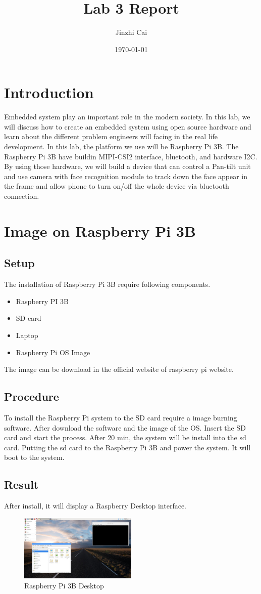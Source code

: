 \documentclass{article}
\title{Lab 3 Report}
\author{Jinzhi Cai}
\date{\today}
\begin{document}
\maketitle
\newpage
\tableofcontents
\clearpage
\section{Introduction}
Embedded system play an important role in the modern society. In this lab, we will discuss how to create an embedded system using open source hardware and learn about the different problem engineers will facing in the real life development. In this lab, the platform we use will be Raspberry Pi 3B. The Raspberry Pi 3B have buildin MIPI-CSI2 interface, bluetooth, and hardware I2C. By using those hardware, we will build a device that can control a Pan-tilt unit and use camera with face recognition module to track down the face appear in the frame and allow phone to turn on/off the whole device via bluetooth connection.

\clearpage
\section{Image on Raspberry Pi 3B}
\subsection{Setup}
The installation of Raspberry Pi 3B require following components.
\begin{itemize}
	\item Raspberry PI 3B
	\item SD card
	\item Laptop
	\item Raspberry Pi OS Image
\end{itemize}
The image can be download in the official website of raspberry pi website.
\subsection{Procedure}
To install the Raspberry Pi system to the SD card require a image burning software. After download the software and the image of the OS. Insert the SD card and start the process. After 20 min, the system will be install into the sd card. Putting the sd card to the Raspberry Pi 3B and power the system. It will boot to the system.
\subsection{Result}
After install, it will display a Raspberry Desktop interface.
\begin{figure}[hb]
	\centering
	\includegraphics[width=0.5\textwidth]{img/Lab2_RBP_DP.jpg}
	\caption{Raspberry Pi 3B Desktop} 
	\label{BBD}
\end{figure}
\clearpage
\end{document}
